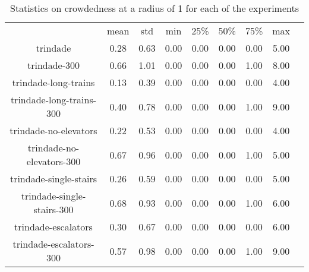 \begin{table*}
    \begin{tabular}{|c|cccccccc|}
      & mean & std & min & 25\% & 50\% & 75\% & max \\
    trindade  & 0.28 & 0.63 & 0.00 & 0.00 & 0.00 & 0.00 & 5.00 \\
    trindade-300  & 0.66 & 1.01 & 0.00 & 0.00 & 0.00 & 1.00 & 8.00 \\
    trindade-long-trains  & 0.13 & 0.39 & 0.00 & 0.00 & 0.00 & 0.00 & 4.00 \\
    trindade-long-trains-300  & 0.40 & 0.78 & 0.00 & 0.00 & 0.00 & 1.00 & 9.00 \\
    trindade-no-elevators  & 0.22 & 0.53 & 0.00 & 0.00 & 0.00 & 0.00 & 4.00 \\
    trindade-no-elevators-300  & 0.67 & 0.96 & 0.00 & 0.00 & 0.00 & 1.00 & 5.00 \\
    trindade-single-stairs  & 0.26 & 0.59 & 0.00 & 0.00 & 0.00 & 0.00 & 5.00 \\
    trindade-single-stairs-300  & 0.68 & 0.93 & 0.00 & 0.00 & 0.00 & 1.00 & 6.00 \\
    trindade-escalators  & 0.30 & 0.67 & 0.00 & 0.00 & 0.00 & 0.00 & 6.00 \\
    trindade-escalators-300  & 0.57 & 0.98 & 0.00 & 0.00 & 0.00 & 1.00 & 9.00 \\
    \end{tabular}
\caption{Statistics on crowdedness at a radius of 1 for each of the experiments}
\label{annex:crowdedness_1}

\end{table*}

